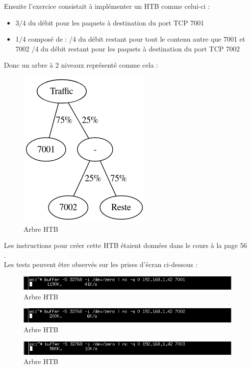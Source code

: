 \documentclass{article}
\begin{document}
Ensuite l'exercice consistait à implémenter un HTB comme celui-ci : \\

\begin{itemize}
	\item 3/4 du débit pour les paquets à destination du port TCP 7001
	\item 1/4 composé de : 
	/4 du débit restant pour tout le contenu autre que 7001 et 7002
	/4 du débit restant pour les paquets à destination du port TCP 7002
\end{itemize}

Donc un arbre à 2 niveaux représenté comme cela :

\begin{figure}[h]
	\centering
	\includegraphics{./arbre-htb.png}
	\caption{Arbre HTB}
	\label{fig:htb-tree}
\end{figure}
\newpage

Les instructions pour créer cette HTB étaient données dans le cours à la page 56 \cite{doc-labo}. \\

Les tests peuvent être observés sur les prises d'écran ci-dessous : 

\begin{figure}[h]
	\centering
	\includegraphics{./captures/htb1.png}
	\caption{Arbre HTB}
	\label{fig:Débit port 7001}
\end{figure}
\begin{figure}[h]
	\centering
	\includegraphics{./captures/htb2.png}
	\caption{Arbre HTB}
	\label{fig:Débit port 7002}
\end{figure}
\begin{figure}[h]
	\centering
	\includegraphics{./captures/htb3.png}
	\caption{Arbre HTB}
	\label{fig:Débit port 7003}
\end{figure}
\newpage
\end{document}
